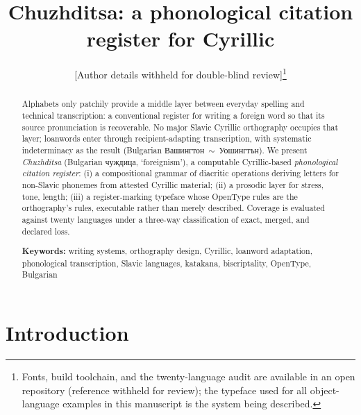 \documentclass[12pt]{article}
\title{\textbf{Chuzhditsa: a phonological citation register for Cyrillic}}
\author{{\normalsize [Author details withheld for double-blind review]}\thanks{Fonts, build toolchain, and the twenty-language audit are available in an open repository (reference withheld for review); the typeface used for all object-language examples in this manuscript is the system being described.}}
\date{}
\newcommand{\cz}[1]{{\chu #1}}
\begin{document}
\maketitle
\onehalfspacing

\begin{abstract}
\noindent Alphabets only patchily provide a middle layer between everyday spelling and technical transcription: a conventional register for writing a foreign word so that its source pronunciation is recoverable. No major Slavic Cyrillic orthography occupies that layer; loanwords enter through recipient-adapting transcription, with systematic indeterminacy as the result (Bulgarian \cz{Вашингтон}~$\sim$~\cz{Уошингтън}). We present \emph{Chuzhditsa} (Bulgarian чуждица, `foreignism'), a computable Cyrillic-based \emph{phonological citation register}: (i) a compositional grammar of diacritic operations deriving letters for non-Slavic phonemes from attested Cyrillic material; (ii) a prosodic layer for stress, tone, length; (iii) a register-marking typeface whose OpenType rules are the orthography's rules, executable rather than merely described. Coverage is evaluated against twenty languages under a three-way classification of exact, merged, and declared loss.

\medskip
\noindent\textbf{Keywords:} writing systems, orthography design, Cyrillic, loanword adaptation, phonological transcription, Slavic languages, katakana, biscriptality, OpenType, Bulgarian
\end{abstract}

\section{Introduction}
\end{document}
